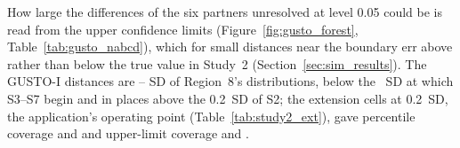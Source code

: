 \documentclass[AMA,Times1COL]{WileyNJDv5}
\begin{document}


How large the differences of the six partners unresolved at level 0.05 could be is read from the upper confidence limits (Figure~\ref{fig:gusto_forest}, Table~\ref{tab:gusto_nabcd}), which for small distances near the boundary err above rather than below the true value in Study~2 (Section~\ref{sec:sim_results}). The GUSTO-I distances are -- SD of Region~8's distributions, below the ~SD at which S3--S7 begin and in places above the 0.2~SD of S2; the extension cells at 0.2~SD, the application's operating point (Table~\ref{tab:study2_ext}), gave percentile coverage  and  and upper-limit coverage  and .
\end{document}
